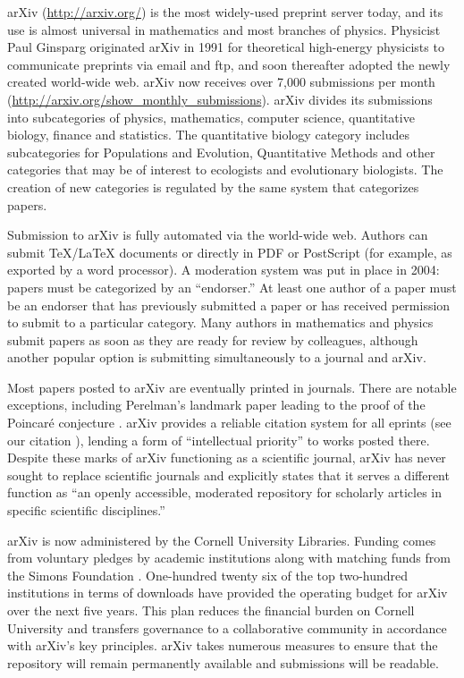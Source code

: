 \documentclass[letterpaper,twocolumn,superscriptaddress,showkeys]{revtex4}
\begin{document}
arXiv (\url{http://arxiv.org/}) is the most widely-used preprint
server today, and its use is almost universal in mathematics and most
branches of physics.  Physicist Paul Ginsparg originated arXiv in 1991
for theoretical high-energy physicists to communicate preprints via
email and ftp, and soon thereafter adopted the newly created
world-wide web\cite{jackson2002preprints}.  arXiv now receives over
7,000 submissions per month
(\url{http://arxiv.org/show_monthly_submissions}).  arXiv divides its
submissions into subcategories of physics, mathematics, computer
science, quantitative biology, finance and statistics.  The
quantitative biology category includes subcategories for Populations
and Evolution, Quantitative Methods and other categories that may be
of interest to ecologists and evolutionary biologists.
The creation of new categories is regulated by the same system that
categorizes papers.

Submission to arXiv is fully automated via the world-wide web.
Authors can submit \TeX{}/\LaTeX{} documents or directly in PDF or
PostScript (for example, as exported by a word processor).  A
moderation system was put in place in 2004: papers must be categorized
by an ``endorser.''  At least one author of a paper must be an
endorser that has previously submitted a paper or has received
permission to submit to a particular category.  Many authors in
mathematics and physics submit papers as soon as they are ready for
review by colleagues, although another popular option is submitting
simultaneously to a journal and arXiv.

Most papers posted to arXiv are eventually printed in journals.  There
are notable exceptions, including Perelman's landmark paper leading to
the proof of the Poincar\'{e} conjecture \cite{2002math.....11159P}.
arXiv provides a reliable citation system for all eprints (see our
citation \cite{2002math.....11159P}), lending a form of ``intellectual
priority'' to works posted there.  Despite these marks of arXiv 
functioning as a scientific journal, arXiv has never sought to replace
scientific journals and explicitly states that it serves a different
function as ``an openly accessible, moderated repository for scholarly
articles in specific scientific disciplines.''

arXiv is now administered by the Cornell University Libraries.
Funding comes from voluntary pledges by academic institutions along
with matching funds from the Simons Foundation \cite{arxiv_future}.
One-hundred twenty six of the top two-hundred institutions in terms of
downloads have provided the operating budget for arXiv over the next
five years.  This plan reduces the financial burden on Cornell
University and transfers governance to a collaborative community in
accordance with arXiv's key principles.  arXiv takes numerous measures
to ensure that the repository will remain permanently available and
submissions will be readable.
\end{document}

